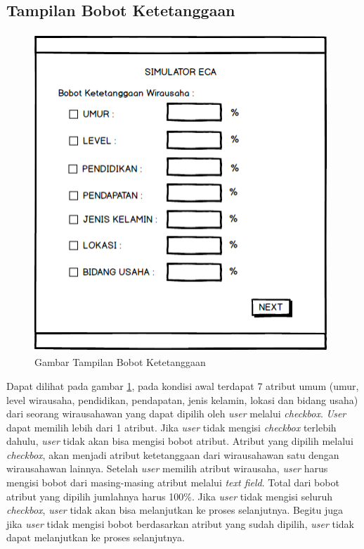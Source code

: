 \subsection{Tampilan Bobot Ketetanggaan}

\begin{figure} [H]
	\centering  
	\includegraphics[width=11cm, height=12cm]{mockup1} 
	\caption[Gambar Tampilan Bobot Ketetanggaan]{Gambar Tampilan Bobot Ketetanggaan}
	\label{fig:kondisiInternal} 
\end{figure}

Dapat dilihat pada gambar \ref{fig:kondisiInternal}, pada kondisi awal terdapat 7 atribut umum (umur, level wirausaha, pendidikan, pendapatan, jenis kelamin, lokasi dan bidang usaha) dari seorang wirausahawan yang dapat dipilih oleh \textit{user} melalui \textit{checkbox}. \textit{User} dapat memilih lebih dari 1 atribut. Jika \textit{user} tidak mengisi \textit{checkbox} terlebih dahulu, \textit{user} tidak akan bisa mengisi bobot atribut. Atribut yang dipilih melalui \textit{checkbox}, akan menjadi atribut ketetanggaan dari wirausahawan satu dengan wirausahawan lainnya. Setelah \textit{user} memilih atribut wirausaha, \textit{user} harus mengisi bobot dari masing-masing atribut melalui \textit{text field}. Total dari bobot atribut yang dipilih jumlahnya harus 100\%. Jika \textit{user} tidak mengisi seluruh \textit{checkbox}, \textit{user} tidak akan bisa melanjutkan ke proses selanjutnya. Begitu juga jika \textit{user} tidak mengisi bobot berdasarkan atribut yang sudah dipilih, \textit{user} tidak dapat melanjutkan ke proses selanjutnya.

